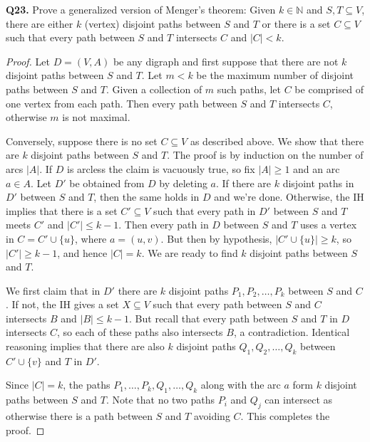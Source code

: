 \noindent \textbf{Q23.} Prove a generalized version of Menger's theorem: Given \( k \in \mathbb{N}  \) and \( S, T \subseteq V \), there are either \( k \) (vertex) disjoint paths between \( S \) and \( T \) or there is a set \( C \subseteq V \) such that every path between \( S \) and \( T \) intersects \( C \) and \( |C| < k \).
\begin{proof}
Let \( D = (V, A) \) be any digraph and first suppose that there are not \( k \) disjoint paths between \( S \) and \( T \). Let \( m < k \) be the maximum number of disjoint paths between \( S \) and \( T \). Given a collection of \( m \) such paths, let \( C \) be comprised of one vertex from each path. Then every path between \( S \) and \( T \) intersects \( C \), otherwise \( m \) is not maximal.

Conversely, suppose there is no set \( C \subseteq V\) as described above. We show that there are \( k \) disjoint paths between \( S \) and \( T \). The proof is by induction on the number of arcs \( |A| \). If \( D \) is arcless the claim is vacuously true, so fix \( |A| \geq 1 \) and an arc \( a \in A \). Let \( D' \) be obtained from \( D \) by deleting \( a \). If there are \( k \) disjoint paths in \( D' \) between \( S \) and \( T \), then the same holds in \( D \) and we're done. Otherwise, the IH implies that there is a set \( C' \subseteq V \) such that every path in \( D' \) between \( S \) and \( T \) meets \( C' \) and \( |C'| \leq k - 1 \). Then every path in \( D \) between \( S \) and \( T \) uses a vertex in \( C = C' \cup \{ u \}  \), where \( a = (u, v) \). But then by hypothesis, \( |C' \cup \{ u \}| \geq k \), so \( |C'| \geq k - 1 \), and hence \( |C| = k \). We are ready to find \( k \) disjoint paths between \( S \) and \( T \).

We first claim that in \( D' \) there are \( k \) disjoint paths \( P_1, P_2, \hdots , P_{k}  \) between \( S \) and \( C \). If not, the IH gives a set \( X \subseteq V \) such that every path between \( S \) and \( C \) intersects \( B \) and \( |B| \leq k - 1 \). But recall that every path between \( S \) and \( T \) in \( D \) intersects \( C \), so each of these paths also intersects \( B \), a contradiction. Identical reasoning implies that there are also \( k \) disjoint paths \( Q_1, Q_2, \hdots , Q_{k}  \) between \( C' \cup \{ v \}  \) and \( T \) in \( D' \).

Since \( |C| = k \), the paths \( P_1, \hdots , P_{k}, Q_1, \hdots , Q_{k} \) along with the arc \( a \) form \( k \) disjoint paths between \( S \) and \( T \). Note that no two paths $P_i$ and $Q_j$ can intersect as otherwise there is a path between $S$ and $T$ avoiding $C$. This completes the proof.
\end{proof}
